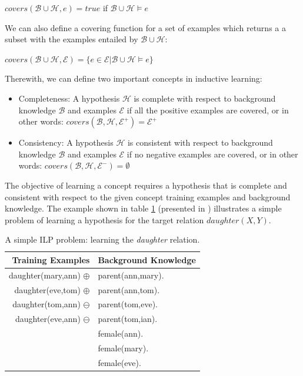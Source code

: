 \begin{center}
 $covers(\mathcal{B} \cup \mathcal{H},e)=true$ if $\mathcal{B} \cup \mathcal{H} \models e$
\end{center}

We can also define a covering function for a set of examples which returns a a subset with the examples entailed by
$\mathcal{B} \cup \mathcal{H}$:

\begin{center}
 $covers(\mathcal{B} \cup \mathcal{H},\mathcal{E})=\{e \in \mathcal{E} | \mathcal{B} \cup \mathcal{H} \models e\}$
\end{center}

Therewith, we can define two important concepts in inductive learning:

\begin{itemize}
 \item Completeness: A hypothesis $\mathcal{H}$ is complete with respect to background knowledge $\mathcal{B}$ and
examples $\mathcal{E}$ if all the positive examples are covered, or in other words:
$covers(\mathcal{B},\mathcal{H},\mathcal{E}^{+})=\mathcal{E}^{+}$
 \item Consistency: A hypothesis $\mathcal{H}$ is consistent with respect to background knowledge $\mathcal{B}$ and
examples $\mathcal{E}$ if no negative examples are covered, or in other words:
$covers(\mathcal{B},\mathcal{H},\mathcal{E}^{-})=\emptyset$
\end{itemize}

The objective of learning a concept requires a hypothesis that is complete and consistent with respect to the given
concept training examples and background knowledge. The example shown in table \ref{tb:ilpExample} (presented in
\cite{DBLP:journals/ml/LavracD96}) illustrates a simple problem of learning a hypothesis for the target relation
$daughter(X,Y)$.

\begin{center}
    \begin{table}[h!]
    \label{tb:ilpExample}
    \caption{A simple ILP problem: learning the \emph{daughter} relation.}
      \begin{tabular}{ r | l }
      \toprule
      \textbf{Training Examples} & \textbf{Background Knowledge}\\
      \midrule
      daughter(mary,ann) $\oplus$	& parent(ann,mary).	\\
      daughter(eve,tom) $\oplus$	& parent(ann,tom).	\\
      daughter(tom,ann) $\ominus$ 	& parent(tom,eve).	\\
      daughter(eve,ann) $\ominus$	& parent(tom,ian).	\\
					& female(ann).		\\
					& female(mary).		\\
					& female(eve).		\\
      \bottomrule
      \end{tabular}
    \end{table}
\end{center}

